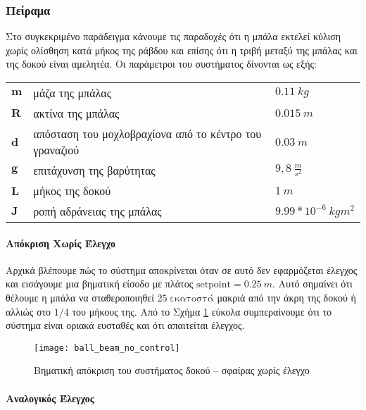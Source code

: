 \subsubsection{Πείραμα}

Στο συγκεκριμένο παράδειγμα κάνουμε τις παραδοχές ότι η μπάλα εκτελεί κύλιση χωρίς ολίσθηση κατά μήκος της ράβδου και επίσης ότι η τριβή μεταξύ της μπάλας και της δοκού είναι αμελητέα. Οι παράμετροι του συστήματος δίνονται ως εξής:
\begin{flushleft}
\begin{tabular}{lll}
$\mathbf{m}$ & μάζα της μπάλας & $0.11\ kg$ \\  
$\mathbf{R}$ & ακτίνα της μπάλας & $0.015\ m$ \\ 
$\mathbf{d}$ & απόσταση του μοχλοβραχίονα από το κέντρο του γραναζιού & $0.03\ m$ \\ 
$\mathbf{g}$ & επιτάχυνση της βαρύτητας & $9,8\ \frac{m}{s^2}$ \\ 
$\mathbf{L}$ & μήκος της δοκού & $1\ m$ \\ 
$\mathbf{J}$ & ροπή αδράνειας της μπάλας & $ 9.99*10^{-6}\ kgm^2 $ \\ 
\end{tabular}
\end{flushleft}

\paragraph{Απόκριση Χωρίς Έλεγχο}\hfill

Αρχικά βλέπουμε πώς το σύστημα αποκρίνεται όταν σε αυτό δεν εφαρμόζεται έλεγχος και εισάγουμε μια βηματική είσοδο με πλάτος $\text{setpoint}=0.25\ m$. Αυτό σημαίνει ότι θέλουμε η μπάλα να σταθεροποιηθεί $25\ \text{εκατοστά}$ μακριά από την άκρη της δοκού ή αλλιώς στο $1/4$ του μήκους της. Από το Σχήμα \ref{fig:ball_beam_no_control} εύκολα συμπεραίνουμε ότι το σύστημα είναι οριακά ευσταθές και ότι απαιτείται έλεγχος.

\begin{figure}[h]
  \centering
  \texttt{[image: ball\_beam\_no\_control]}
  \caption{Βηματική απόκριση του συστήματος δοκού -- σφαίρας χωρίς έλεγχο}
  \label{fig:ball_beam_no_control}
\end{figure}

\paragraph{Αναλογικός Έλεγχος}\hfill

